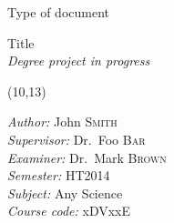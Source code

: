 
\newsavebox{\mybox}
\newlength{\mydepth}
\newlength{\myheight}

\newenvironment{tassel}
{\begin{lrbox}{\mybox}\begin{minipage}{\textwidth}}
{\end{minipage}\end{lrbox}
 \settodepth{\mydepth}{\usebox{\mybox}}
 \settoheight{\myheight}{\usebox{\mybox}}
 \addtolength{\myheight}{\mydepth}
 \noindent\makebox[0pt]{\hspace{-20pt} %
 \rule[-\mydepth]{1pt}{\myheight}} %
 \usebox{\mybox}}

\begin{titlepage}

\setlength{\wpXoffset}{-8.3cm}
\setlength{\wpYoffset}{12.5cm}


\begin{tassel}
    \vspace{7.5cm} %
    \normalfont \normalsize
    \huge Type of document \\ %
    \vspace{-1.3cm}
\end{tassel}

\vspace{3cm}

\begin{flushleft}
    \normalfont 
    \huge Title \\ %
    \huge \it Degree project in progress  %
\end{flushleft}

\null
\vfill

\begin{textblock}{6}(10,13)
\begin{flushright}
\begin{minipage}{\textwidth}
\begin{flushleft} \normalfont \large
\emph{Author:} John \textsc{Smith}\\
\emph{Supervisor:} Dr.~Foo \textsc{Bar}\\
\emph{Examiner:} Dr.~Mark \textsc{Brown}\\
\emph{Semester:} HT2014\\
\emph{Subject:} Any Science\\
\emph{Course code:} xDVxxE
\end{flushleft}
\end{minipage}
\end{flushright}
\end{textblock}

\end{titlepage}

\restoregeometry
